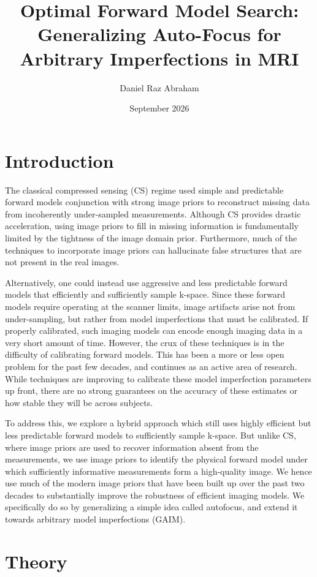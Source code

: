 \documentclass{article}
\title{Optimal Forward Model Search: Generalizing Auto-Focus for Arbitrary Imperfections in MRI}
\author{Daniel Raz Abraham}
\date{September 2026}
\begin{document}
\maketitle

\section{Introduction}
The classical compressed sensing (CS) regime used simple and predictable forward models conjunction with strong image priors to reconstruct missing data from incoherently under-sampled measurements. Although CS provides drastic acceleration, using image priors to fill in missing information is fundamentally limited by the tightness of the image domain prior. Furthermore, much of the techniques to incorporate image priors can hallucinate false structures that are not present in the real images.

Alternatively, one could instead use aggressive and less predictable forward models that efficiently and sufficiently sample k-space. Since these forward models require operating at the scanner limits, image artifacts arise not from under-sampling, but rather from model imperfections that must be calibrated. If properly calibrated, such imaging models can encode enough imaging data in a very short amount of time. However, the crux of these techniques is in the difficulty of calibrating forward models. This has been a more or less open problem for the past few decades, and continues as an active area of research. While techniques are improving to calibrate these model imperfection parameters up front, there are no strong guarantees on the accuracy of these estimates or how stable they will be across subjects. 

To address this, we explore a hybrid approach which still uses highly efficient but less predictable forward models to sufficiently sample k-space. But unlike CS, where image priors are used to recover information absent from the measurements, we use image priors to identify the physical forward model under which sufficiently informative measurements form a high-quality image. We hence use much of the modern image priors that have been built up over the past two decades to substantially improve the robustness of efficient imaging models. We specifically do so by generalizing a simple idea called autofocus, and extend it towards arbitrary model imperfections (GAIM). 

\section{Theory}
\end{document}
